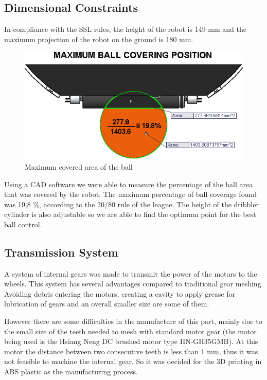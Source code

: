 \subsection{Dimensional Constraints}

In compliance with the SSL rules, the height of the robot is 149 mm and the maximum projection of the robot on the ground is 180 mm.

\begin{figure}[!htb]
	\centering
	\includegraphics[width = 0.8 \textwidth]{img/20-80_rule.png}
	\caption[]{Maximum covered area of the ball}
\end{figure}

Using a CAD software we were able to measure the percentage of the ball area that was covered by the robot. The maximum percentage of ball coverage found was 19,8 \%, according to the 20/80 rule of the league. The height of the dribbler cylinder is also adjustable so we are able to find the optimum point for the best ball control. 

\subsection{Transmission System}

A system of internal gears was made to transmit the power of the motors to the wheels. This system has several advantages compared to traditional gear meshing. Avoiding debris entering the motors, creating a cavity to apply grease for lubrication of gears and an overall smaller size are some of them.

However there are some difficulties in the manufacture of this part, mainly due to the small size of the teeth needed to mesh with standard motor gear (the motor being used is the Hsiang Neng DC brushed motor type HN-GH35GMB). At this motor the distance between two consecutive teeth is less than 1 mm, thus it was not feasible to machine the internal gear. So it was decided for the 3D printing in ABS plastic as the manufacturing process.

